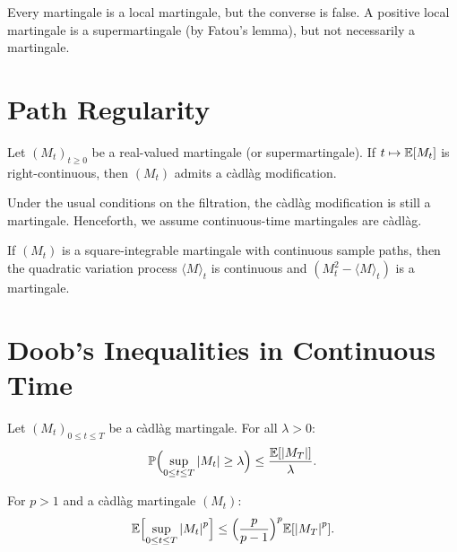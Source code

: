 \begin{warning}[title=\textbf{Local Martingale $\neq$ Martingale}]
Every martingale is a local martingale, but the converse is false. A positive
local martingale is a supermartingale (by Fatou's lemma), but not necessarily a
martingale.
\end{warning}

\section{Path Regularity}

\begin{theorem}
\label{thm:cadlag}
Let $(M_t)_{t \geq 0}$ be a real-valued martingale (or supermartingale). If
$t \mapsto \mathbb{E}[M_t]$ is right-continuous, then $(M_t)$ admits a c\`adl\`ag
modification.
\end{theorem}

\begin{remark}
Under the usual conditions on the filtration, the c\`adl\`ag modification is
still a martingale. Henceforth, we assume continuous-time martingales are
c\`adl\`ag.
\end{remark}

\begin{theorem}
If $(M_t)$ is a square-integrable martingale with continuous sample paths, then
the quadratic variation process $\langle M \rangle_t$ is continuous and
$(M_t^2 - \langle M \rangle_t)$ is a martingale.
\end{theorem}

\section{Doob's Inequalities in Continuous Time}

\begin{theorem}
Let $(M_t)_{0 \leq t \leq T}$ be a c\`adl\`ag martingale. For all $\lambda > 0$:
\[
  \mathbb{P}\Bigl(\sup_{0 \leq t \leq T} \left| M_t \right| \geq \lambda\Bigr)
  \leq \frac{\mathbb{E}[\left| M_T \right|]}{\lambda}.
\]
\end{theorem}

\begin{theorem}
For $p > 1$ and a c\`adl\`ag martingale $(M_t)$:
\[
  \mathbb{E}\Bigl[\sup_{0 \leq t \leq T} \left| M_t \right|^p\Bigr]
  \leq \Bigl(\frac{p}{p-1}\Bigr)^p \mathbb{E}[\left| M_T \right|^p].
\]
\end{theorem}

